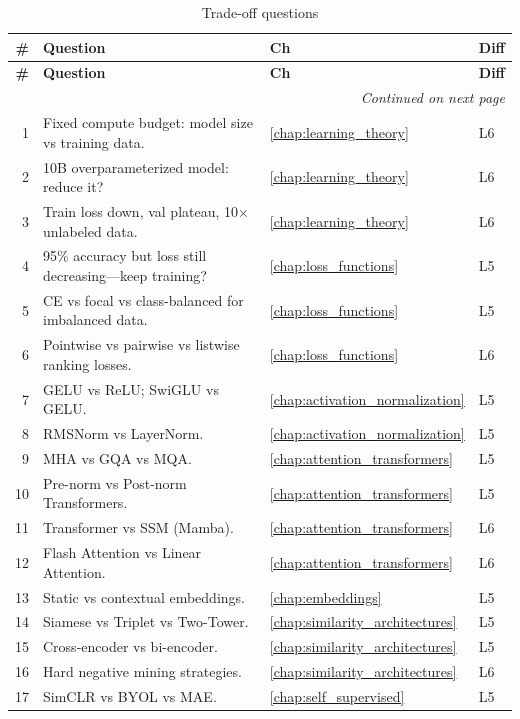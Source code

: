 \begin{longtable}{rp{8.5cm}ll}
\caption{Trade-off questions} \\
\toprule
\textbf{\#} & \textbf{Question} & \textbf{Ch} & \textbf{Diff} \\
\midrule
\endfirsthead
\toprule
\textbf{\#} & \textbf{Question} & \textbf{Ch} & \textbf{Diff} \\
\midrule
\endhead
\midrule
\multicolumn{4}{r}{\textit{Continued on next page}} \\
\endfoot
\bottomrule
\endlastfoot

1 & Fixed compute budget: model size vs training data. & \ref{chap:learning_theory} & L6 \\
2 & 10B overparameterized model: reduce it? & \ref{chap:learning_theory} & L6 \\
3 & Train loss down, val plateau, 10$\times$ unlabeled data. & \ref{chap:learning_theory} & L6 \\
4 & 95\% accuracy but loss still decreasing---keep training? & \ref{chap:loss_functions} & L5 \\
5 & CE vs focal vs class-balanced for imbalanced data. & \ref{chap:loss_functions} & L5 \\
6 & Pointwise vs pairwise vs listwise ranking losses. & \ref{chap:loss_functions} & L6 \\
7 & GELU vs ReLU; SwiGLU vs GELU. & \ref{chap:activation_normalization} & L5 \\
8 & RMSNorm vs LayerNorm. & \ref{chap:activation_normalization} & L5 \\
9 & MHA vs GQA vs MQA. & \ref{chap:attention_transformers} & L5 \\
10 & Pre-norm vs Post-norm Transformers. & \ref{chap:attention_transformers} & L5 \\
11 & Transformer vs SSM (Mamba). & \ref{chap:attention_transformers} & L6 \\
12 & Flash Attention vs Linear Attention. & \ref{chap:attention_transformers} & L6 \\
13 & Static vs contextual embeddings. & \ref{chap:embeddings} & L5 \\
14 & Siamese vs Triplet vs Two-Tower. & \ref{chap:similarity_architectures} & L5 \\
15 & Cross-encoder vs bi-encoder. & \ref{chap:similarity_architectures} & L5 \\
16 & Hard negative mining strategies. & \ref{chap:similarity_architectures} & L6 \\
17 & SimCLR vs BYOL vs MAE. & \ref{chap:self_supervised} & L5 \\

\end{longtable}
